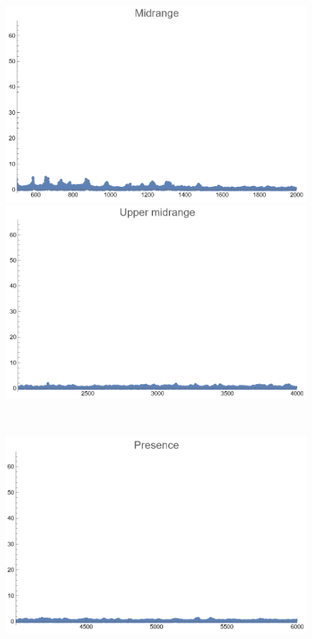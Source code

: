 \documentclass[12pt, letterpaper]{article}
\begin{document}
\begin{figure}[H]
\begin{minipage}{.3\textwidth}
  \end{minipage}
  \begin{minipage}{0.03\textwidth}\end{minipage}
  \begin{minipage}{.3\textwidth}
    \centering
    \includegraphics[width=.9\linewidth]{imgs/Cancion2/mid.png}
  \end{minipage}
  \begin{minipage}{0.03\textwidth}\end{minipage}
  \begin{minipage}{.3\textwidth}
    \centering
    \includegraphics[width=.9\linewidth]{imgs/Cancion2/upmid.png}
  \end{minipage} \medskip \\
  \begin{minipage}{.3\textwidth}
    \centering
    \includegraphics[width=.9\linewidth]{imgs/Cancion2/presence.png}

\end{minipage}
\end{figure}
\end{document}
